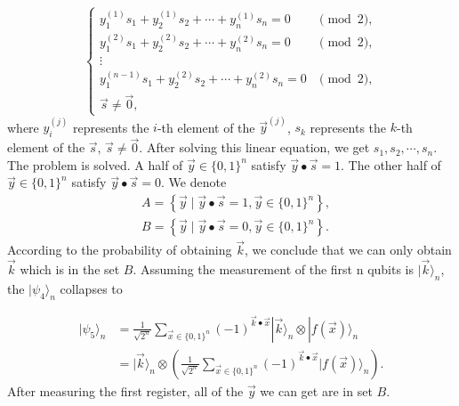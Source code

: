 $$
\begin{cases}
y_1^{(1)} s_1+y_2^{(1)} s_2+\cdots+y_n^{(1)} s_n=0 & \pmod{2}, \\ 
y_1^{(2)} s_1+y_2^{(2)} s_2+\cdots+y_n^{(2)} s_n=0 & \pmod{2}, \\ 
\vdots \\ 
y_1^{(n-1)} s_1+y_2^{(2)} s_2+\cdots+y_n^{(2)} s_n=0 & \pmod{2}, \\
\vec{s} \neq \vec{0}, & 
\end{cases}
$$
where $y_i^{(j)}$ represents the $i$-th element of the $\vec{y}^{(j)}$, $s_k$ represents the $k$-th element of the $\vec{s}$, $\vec{s} \neq \vec{0}$. After solving this linear equation, we get $s_1, s_2, \cdots, s_n$. The problem is solved. A half of $\vec{y} \in \{0,1\}^n$ satisfy $\vec{y} \bullet \vec{s}=1$. The other half of $\vec{y} \in \{0,1\}^n$ satisfy $\vec{y} \bullet \vec{s}=0$. We denote 
$$
\begin{aligned}
        & A=\left\{\vec{y} \mid \vec{y} \bullet \vec{s} = 1, \vec{y} \in\{0,1\}^n\right\}, \\
        & B=\left\{\vec{y} \mid \vec{y} \bullet \vec{s} = 0, \vec{y} \in\{0,1\}^n\right\}.
    \end{aligned}
$$
According to the probability of obtaining $\vec{k}$, we conclude that we can only obtain $\vec{k}$ which is in the set $B$. Assuming the measurement of the first n qubits is $|\vec{k}\rangle_n$, the $|\psi_4\rangle_n$ collapses to

$$
\begin{aligned}
|\psi_5\rangle_n 
& = \frac{1}{\sqrt{2^n}} \sum_{\vec{x} \in\{0,1\}^n}(-1)^{\vec{k} \bullet \vec{x}}|\vec{k}\rangle_n \otimes|f(\vec{x})\rangle_n\\
& = |\vec{k}\rangle_n \otimes\left(\frac{1}{\sqrt{2^n}} \sum_{\vec{x} \in\{0,1\}^n}(-1)^{\vec{k} \bullet \vec{x}}|f(\vec{x})\rangle_n\right).
\end{aligned}
$$
After measuring the first register, all of the $\vec{y}$ we can get are in set $B$. 


